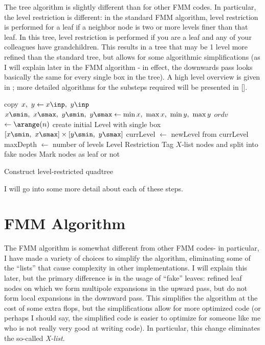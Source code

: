 \documentclass{article}
\begin{document}
The tree algorithm is slightly different than for other FMM codes. In particular, the level restriction is different: in the standard FMM algorithm, level restriction is performed for a leaf if a neighbor node is two or more levels finer than that leaf. In this tree, level restriction is performed if you are a leaf and any of your colleagues have grandchildren. This results in a tree that may be 1 level more refined than the standard tree, but allows for some algorithmic simplifications (as I will explain later in the FMM algorithm - in effect, the downwards pass looks basically the same for every single box in the tree). A high level overview is given in ; more detailed algorithms for the substeps required will be presented in [].

\begin{algorithm}[h!]
\DontPrintSemicolon
{}
copy $x,\ y \gets x\inp,\ y\inp$\;
$x\smin,\ x\smax,\ y\smin,\ y\smax \gets \min x,\ \max x,\ \min y,\ \max y$\;
$ordv$ $\gets \arange(n)$\;
create initial Level with single box $[x\smin,\ x\smax]\times[y\smin,\ y\smax]$\;
 {
	currLevel $\gets$ newLevel from currLevel\;
}
maxDepth $\gets$ number of levels\;
Level Restriction\;
Tag $X$-list nodes and split into fake nodes\;
Mark nodes as leaf or not\;
\caption{Construct level-restricted quadtree}
\label{algo:tree}
\end{algorithm}

I will go into some more detail about each of these steps.

\section{FMM Algorithm}

The FMM algorithm is somewhat different from other FMM codes- in particular, I have made a variety of choices to simplify the algorithm, eliminating some of the ``lists'' that cause complexity in other implementations. I will explain this later, but the primary difference is in the usage of ``fake'' leaves: refined leaf nodes on which we form multipole expansions in the upward pass, but do not form local expansions in the downward pass. This simplifies the algorithm at the cost of some extra flops, but the simplifications allow for more optimized code (or perhaps I should say, the simplified code is easier to optimize for someone like me who is not really very good at writing code). In particular, this change eliminates the so-called \emph{X-list}.
\end{document}
